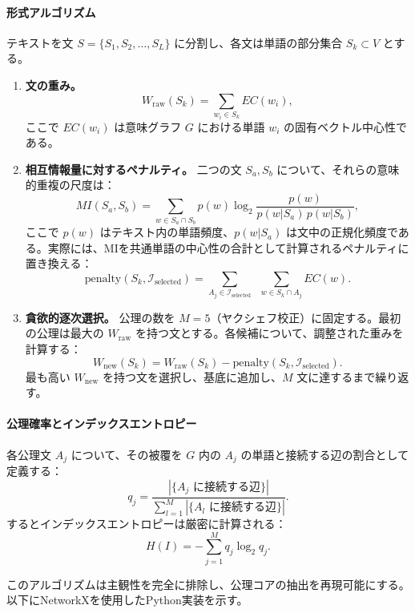 \documentclass[11pt,a4paper]{article}
\begin{document}
	\paragraph{形式アルゴリズム}
	テキストを文 \(S = \{S_1, S_2, \dots, S_L\}\) に分割し、各文は単語の部分集合 \(S_k \subset V\) とする。
	
	\begin{enumerate}
		\item \textbf{文の重み。}
		\[
		W_{\text{raw}}(S_k) = \sum_{w_i \in S_k} EC(w_i),
		\]
		ここで \(EC(w_i)\) は意味グラフ \(G\) における単語 \(w_i\) の固有ベクトル中心性である。
		
		\item \textbf{相互情報量に対するペナルティ。}
		二つの文 \(S_a, S_b\) について、それらの意味的重複の尺度は：
		\[
		MI(S_a, S_b) = \sum_{w \in S_a \cap S_b} p(w) \log_2 \frac{p(w)}{p(w|S_a)\, p(w|S_b)},
		\]
		ここで \(p(w)\) はテキスト内の単語頻度、\(p(w|S_a)\) は文中の正規化頻度である。実際には、MIを共通単語の中心性の合計として計算されるペナルティに置き換える：
		\[
		\text{penalty}(S_k, \mathcal{I}_{\text{selected}}) = \sum_{A_j \in \mathcal{I}_{\text{selected}}} \;\; \sum_{w \in S_k \cap A_j} EC(w).
		\]
		
		\item \textbf{貪欲的逐次選択。}
		公理の数を \(M = 5\)（ヤクシェフ校正）に固定する。最初の公理は最大の \(W_{\text{raw}}\) を持つ文とする。各候補について、調整された重みを計算する：
		\[
		W_{\text{new}}(S_k) = W_{\text{raw}}(S_k) - \text{penalty}(S_k, \mathcal{I}_{\text{selected}}).
		\]
		最も高い \(W_{\text{new}}\) を持つ文を選択し、基底に追加し、\(M\) 文に達するまで繰り返す。
	\end{enumerate}
	
	\paragraph{公理確率とインデックスエントロピー}
	各公理文 \(A_j\) について、その被覆を \(G\) 内の \(A_j\) の単語と接続する辺の割合として定義する：
	\[
	q_j = \frac{|\{\text{\(A_j\) に接続する辺}\}|}{\sum_{l=1}^M |\{\text{\(A_l\) に接続する辺}\}|}.
	\]
	するとインデックスエントロピーは厳密に計算される：
	\[
	H(I) = -\sum_{j=1}^{M} q_j \log_2 q_j.
	\]
	
	このアルゴリズムは主観性を完全に排除し、公理コアの抽出を再現可能にする。以下にNetworkXを使用したPython実装を示す。
	
\end{document}
